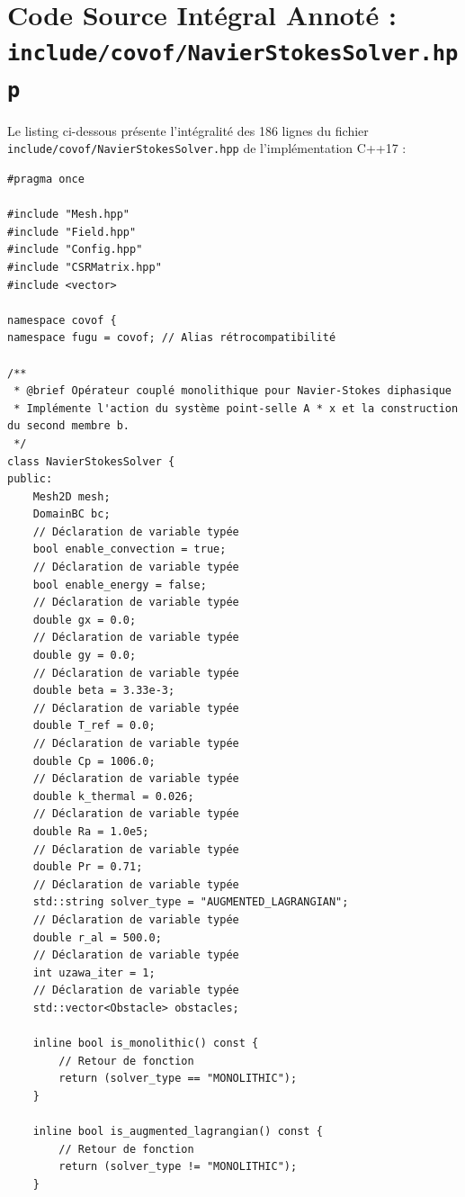 \documentclass[10pt,a4paper,oneside]{book}
\begin{document}
\section{Code Source Intégral Annoté : \texttt{include/covof/NavierStokesSolver.hpp}}
Le listing ci-dessous présente l'intégralité des 186 lignes du fichier \texttt{include/covof/NavierStokesSolver.hpp} de l'implémentation C++17 :

\begin{lstlisting}[language={[11]C++}]
#pragma once

#include "Mesh.hpp"
#include "Field.hpp"
#include "Config.hpp"
#include "CSRMatrix.hpp"
#include <vector>

namespace covof {
namespace fugu = covof; // Alias rétrocompatibilité

/**
 * @brief Opérateur couplé monolithique pour Navier-Stokes diphasique
 * Implémente l'action du système point-selle A * x et la construction du second membre b.
 */
class NavierStokesSolver {
public:
    Mesh2D mesh;
    DomainBC bc;
    // Déclaration de variable typée
    bool enable_convection = true;
    // Déclaration de variable typée
    bool enable_energy = false;
    // Déclaration de variable typée
    double gx = 0.0;
    // Déclaration de variable typée
    double gy = 0.0;
    // Déclaration de variable typée
    double beta = 3.33e-3;
    // Déclaration de variable typée
    double T_ref = 0.0;
    // Déclaration de variable typée
    double Cp = 1006.0;
    // Déclaration de variable typée
    double k_thermal = 0.026;
    // Déclaration de variable typée
    double Ra = 1.0e5;
    // Déclaration de variable typée
    double Pr = 0.71;
    // Déclaration de variable typée
    std::string solver_type = "AUGMENTED_LAGRANGIAN";
    // Déclaration de variable typée
    double r_al = 500.0;
    // Déclaration de variable typée
    int uzawa_iter = 1;
    // Déclaration de variable typée
    std::vector<Obstacle> obstacles;

    inline bool is_monolithic() const {
        // Retour de fonction
        return (solver_type == "MONOLITHIC");
    }

    inline bool is_augmented_lagrangian() const {
        // Retour de fonction
        return (solver_type != "MONOLITHIC");
    }


\end{lstlisting}
\end{document}
